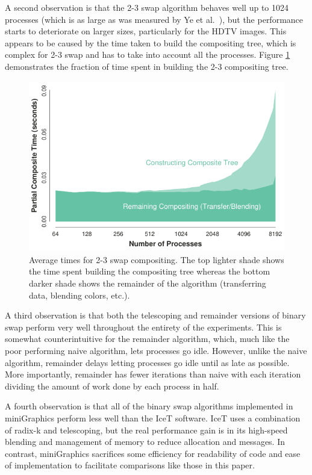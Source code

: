 \documentclass{vgtc}                          %
\newcommand*{\scite}[1]{~\cite{#1}}
\newcommand{\textalgorithm}[1]{\textsf{#1}\xspace}
\newcommand{\binaryswap}{\textalgorithm{binary swap}}
\newcommand{\ttswap}{\textalgorithm{2-3 swap}}
\newcommand{\naive}{\textalgorithm{naive}}
\newcommand{\telescoping}{\textalgorithm{telescoping}}
\newcommand{\remainder}{\textalgorithm{remainder}}
\newcommand{\radixk}{\textalgorithm{radix-k}}
\begin{document}
A second observation is that the \ttswap algorithm behaves well up to 1024 processes (which is as large as was measured by Ye et al.\scite{23Swap}), but the performance starts to deteriorate on larger sizes, particularly for the HDTV images.
This appears to be caused by the time taken to build the compositing tree, which is complex for \ttswap and has to take into account all the processes.
Figure \ref{fig:23SwapOverhead} demonstrates the fraction of time spent in building the 2-3 compositing tree.

\begin{figure}[htb]
  \centering
  \includegraphics[width=\linewidth]{2-3-swap-overhead}
  \caption{
    Average times for \ttswap compositing.
    The top lighter shade shows the time spent building the compositing tree whereas the bottom darker shade shows the remainder of the algorithm (transferring data, blending colors, etc.).
  }
  \label{fig:23SwapOverhead}
\end{figure}

A third observation is that both the \telescoping and \remainder versions of binary swap perform very well throughout the entirety of the experiments.
This is somewhat counterintuitive for the \remainder algorithm, which, much like the poor performing \naive algorithm, lets processes go idle.
However, unlike the \naive algorithm, \remainder delays letting processes go idle until as late as possible.
More importantly, \remainder has fewer iterations than \naive with each iteration dividing the amount of work done by each process in half.

A fourth observation is that all of the \binaryswap algorithms implemented in miniGraphics perform less well than the IceT software.
IceT uses a combination of \radixk and \telescoping, but the real performance gain is in its high-speed blending and management of memory to reduce allocation and messages.
In contrast, miniGraphics sacrifices some efficiency for readability of code and ease of implementation to facilitate comparisons like those in this paper.
\end{document}
